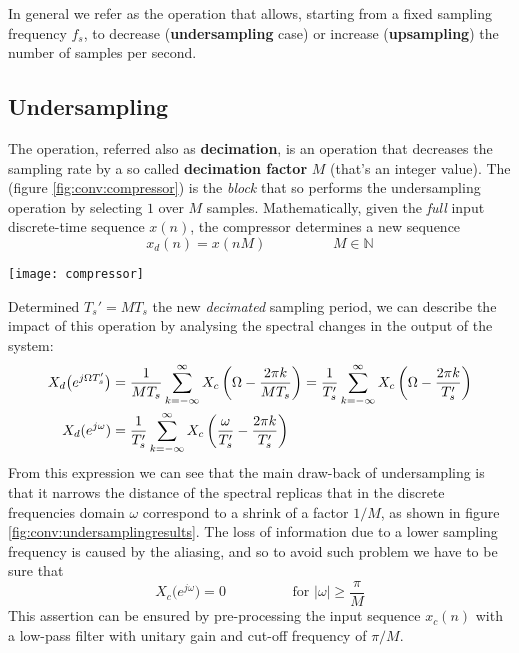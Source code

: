 	In general we refer as  the operation that allows, starting from a fixed sampling frequency $f_s$, to decrease (\textbf{undersampling} case) or increase (\textbf{upsampling}) the number of samples per second.

	\subsection{Undersampling}
		
		The  operation, referred also as \textbf{decimation}, is an operation that decreases the sampling rate by a so called \textbf{decimation factor} $M$ (that's an integer value). The  (figure \ref{fig:conv:compressor}) is the \textit{block} that so performs the undersampling operation by selecting $1$ over $M$ samples. Mathematically, given the \textit{full} input discrete-time sequence $x(n)$, the compressor determines a new sequence
		\begin{equation}
			x_d(n) = x(nM) \hspace{2cm} M \in \mathds N
		\end{equation}
		
		\begin{SCfigure}[2][bht]
			\centering \texttt{[image: compressor]}
			\caption{compressor performing an undersampling with decimation factor $M$.} \label{fig:conv:compressor}
		\end{SCfigure}
		
		Determined $T_s' = M T_s$ the new \textit{decimated} sampling period, we can describe the impact of this operation by analysing the spectral changes in the output of the system:
		\begin{equation}
		\begin{aligned}
			X_d\big(e^{j\Omega T_s'}\big) & = \frac 1{MT_s} \sum_{k=-\infty}^\infty X_c\left( \Omega - \frac{2\pi k}{MT_s} \right)  = \frac 1{T_s'} \sum_{k=-\infty}^\infty X_c\left( \Omega - \frac{2\pi k}{T_s'} \right)  \\
			X_d(e^{j\omega}) & = \frac 1 {T_s'} \sum_{k=-\infty}^\infty X_c\left( \frac{\omega}{T_s'} - \frac{2\pi k}{T_s'}\right)
		\end{aligned}
		\end{equation}
		From this expression we can see that the main draw-back of undersampling is that it narrows the distance of the spectral replicas that in the discrete frequencies domain $\omega$ correspond to a shrink of a factor $1/M$, as shown in figure \ref{fig:conv:undersamplingresults}. The loss of information due to a lower sampling frequency is caused by the aliasing, and so to avoid such problem we have to be sure that
		\[ X_c\big( e^{j\omega} \big) = 0 \hspace{2cm} \textrm{for } |\omega|\geq \frac \pi M \]
 		This assertion can be ensured by pre-processing the input sequence $x_c(n)$ with a low-pass filter with unitary gain and cut-off frequency of $\pi/M$.
 		
